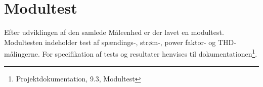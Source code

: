 
\section{Modultest}

Efter udviklingen af den samlede Måleenhed er der lavet en modultest. Modultesten indeholder test af spændings-, strøm-, power faktor- og THD-målingerne. For specifikation af tests og resultater henvises til dokumentationen\footnote{Projektdokumentation, 9.3, Modultest}.

